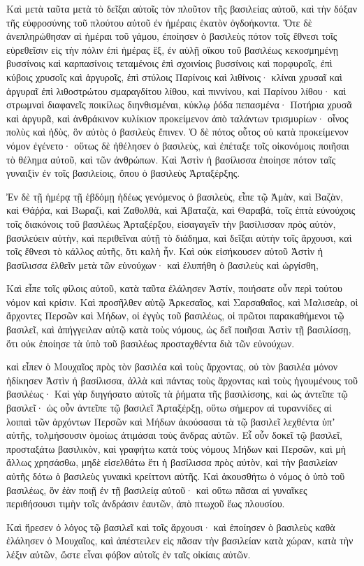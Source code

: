{\par }{\PP {}Καὶ μετὰ ταῦτα μετὰ τὸ δεῖξαι αὐτοῖς τὸν πλοῦτον τῆς βασιλείας αὐτοῦ, καὶ τὴν δόξαν τῆς εὐφροσύνης τοῦ πλούτου αὐτοῦ ἐν ἡμέραις ἑκατὸν ὀγδοήκοντα.
Ὅτε δὲ ἀνεπληρώθησαν αἱ ἡμέραι τοῦ γάμου, ἐποίησεν ὁ βασιλεὺς πότον τοῖς ἔθνεσι τοῖς εὑρεθεῖσιν εἰς τὴν πόλιν ἐπὶ ἡμέρας ἓξ, ἐν αὐλῇ οἴκου τοῦ βασιλέως
κεκοσμημένῃ βυσσίνοις καὶ καρπασίνοις τεταμένοις ἐπὶ σχοινίοις βυσσίνοις καὶ πορφυροῖς, ἐπὶ κύβοις χρυσοῖς καὶ ἀργυροῖς, ἐπὶ στύλοις Παρίνοις καὶ λιθίνοις· κλίναι χρυσαῖ καὶ ἀργυραῖ ἐπὶ λιθοστρώτου σμαραγδίτου λίθου, καὶ πιννίνου, καὶ Παρίνου λίθου· καὶ στρωμναὶ διαφανεῖς ποικίλως διηνθισμέναι, κύκλῳ ῥόδα πεπασμένα·
Ποτήρια χρυσᾶ καὶ ἀργυρᾶ, καὶ ἀνθράκινον κυλίκιον προκείμενον ἀπὸ ταλάντων τρισμυρίων· οἶνος πολὺς καὶ ἡδὺς, ὃν αὐτὸς ὁ βασιλεὺς ἔπινεν.
Ὁ δὲ πότος οὗτος οὐ κατὰ προκείμενον νόμον ἐγένετο· οὕτως δὲ ἠθέλησεν ὁ βασιλεὺς, καὶ ἐπέταξε τοῖς οἰκονόμοις ποιῆσαι τὸ θέλημα αὐτοῦ, καὶ τῶν ἀνθρώπων.
Καὶ Ἀστὶν ἡ βασίλισσα ἐποίησε πότον ταῖς γυναιξὶν ἐν τοῖς βασιλείοις, ὅπου ὁ βασιλεὺς Ἀρταξέρξης.
\par }{\PP {}Ἐν δὲ τῇ ἡμέρᾳ τῇ ἑβδόμῃ ἡδέως γενόμενος ὁ βασιλεὺς, εἶπε τῷ Ἀμὰν, καὶ Βαζὰν, καὶ Θάῤῥα, καὶ Βωραζὶ, καὶ Ζαθολθὰ, καὶ Ἀβαταζὰ, καὶ Θαραβά, τοῖς ἑπτὰ εὐνούχοις τοῖς διακόνοις τοῦ βασιλέως Ἀρταξέρξου,
εἰσαγαγεῖν τὴν βασίλισσαν πρὸς αὐτὸν, βασιλεύειν αὐτὴν, καὶ περιθεῖναι αὐτῇ τὸ διάδημα, καὶ δεῖξαι αὐτὴν τοῖς ἄρχουσι, καὶ τοῖς ἔθνεσι τὸ κάλλος αὐτῆς, ὅτι καλὴ ἦν.
Καὶ οὐκ εἰσήκουσεν αὐτοῦ Ἀστὶν ἡ βασίλισσα ἐλθεῖν μετὰ τῶν εὐνούχων· καὶ ἐλυπήθη ὁ βασιλεὺς καὶ ὠργίσθη,
\par }{\PP {}Καὶ εἶπε τοῖς φίλοις αὐτοῦ, κατὰ ταῦτα ἐλάλησεν Ἀστίν, ποιήσατε οὖν περὶ τούτου νόμον καὶ κρίσιν.
Καὶ προσῆλθεν αὐτῷ Ἀρκεσαῖος, καὶ Σαρσαθαῖος, καὶ Μαλισεὰρ, οἱ ἄρχοντες Περσῶν καὶ Μήδων, οἱ ἐγγὺς τοῦ βασιλέως, οἱ πρῶτοι παρακαθήμενοι τῷ βασιλεῖ,
καὶ ἀπήγγειλαν αὐτῷ κατὰ τοὺς νόμους, ὡς δεῖ ποιῆσαι Ἀστὶν τῇ βασιλίσσῃ, ὅτι οὐκ ἐποίησε τὰ ὑπὸ τοῦ βασιλέως προσταχθέντα διὰ τῶν εὐνούχων.
\par }{\PP {}καὶ εἶπεν ὁ Μουχαῖος πρὸς τὸν βασιλέα καὶ τοὺς ἄρχοντας, οὐ τὸν βασιλέα μόνον ἠδίκησεν Ἀστὶν ἡ βασίλισσα, ἀλλὰ καὶ πάντας τοὺς ἄρχοντας καὶ τοὺς ἡγουμένους τοῦ βασιλέως·
Καὶ γὰρ διηγήσατο αὐτοῖς τὰ ῥήματα τῆς βασιλίσσης, καὶ ὡς ἀντεῖπε τῷ βασιλεῖ· ὡς οὖν ἀντεῖπε τῷ βασιλεῖ Ἀρταξέρξῃ,
οὕτω σήμερον αἱ τυραννίδες αἱ λοιπαὶ τῶν ἀρχόντων Περσῶν καὶ Μήδων ἀκούσασαι τὰ τῷ βασιλεῖ λεχθέντα ὑπʼ αὐτῆς, τολμήσουσιν ὁμοίως ἀτιμάσαι τοὺς ἄνδρας αὐτῶν.
Εἶ οὖν δοκεῖ τῷ βασιλεῖ, προσταξάτω βασιλικὸν, καὶ γραφήτω κατὰ τοὺς νόμους Μήδων καὶ Περσῶν, καὶ μὴ ἄλλως χρησάσθω, μηδὲ εἰσελθάτω ἔτι ἡ βασίλισσα πρὸς αὐτὸν, καὶ τὴν βασιλείαν αὐτῆς δότω ὁ βασιλεὺς γυναικὶ κρείττονι αὐτῆς.
Καὶ ἀκουσθήτω ὁ νόμος ὁ ὑπὸ τοῦ βασιλέως, ὃν ἐὰν ποιῇ ἐν τῇ βασιλείᾳ αὐτοῦ· καὶ οὕτω πᾶσαι αἱ γυναῖκες περιθήσουσι τιμὴν τοῖς ἀνδράσιν ἑαυτῶν, ἀπὸ πτωχοῦ ἕως πλουσίου.
\par }{\PP {}Καὶ ἤρεσεν ὁ λόγος τῷ βασιλεῖ καὶ τοῖς ἄρχουσι· καὶ ἐποίησεν ὁ βασιλεὺς καθὰ ἐλάλησεν ὁ Μουχαῖος,
καὶ ἀπέστειλεν εἰς πᾶσαν τὴν βασιλείαν κατὰ χώραν, κατὰ τὴν λέξιν αὐτῶν, ὥστε εἶναι φόβον αὐτοῖς ἐν ταῖς οἰκίαις αὐτῶν.

}
